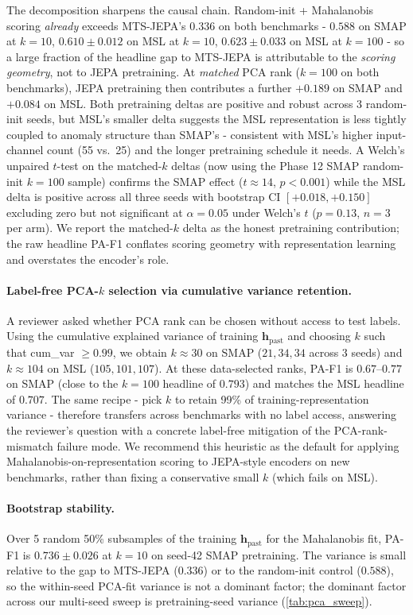 \documentclass{article}
\newcommand{\h}{\mathbf{h}}
\begin{document}
The decomposition sharpens the causal chain. Random-init + Mahalanobis scoring \emph{already} exceeds MTS-JEPA's $0.336$ on both benchmarks - $0.588$ on SMAP at $k=10$, $0.610 \pm 0.012$ on MSL at $k=10$, $0.623 \pm 0.033$ on MSL at $k=100$ - so a large fraction of the headline gap to MTS-JEPA is attributable to the \emph{scoring geometry}, not to JEPA pretraining. At \emph{matched} PCA rank ($k=100$ on both benchmarks), JEPA pretraining then contributes a further $+0.189$ on SMAP and $+0.084$ on MSL. Both pretraining deltas are positive and robust across 3 random-init seeds, but MSL's smaller delta suggests the MSL representation is less tightly coupled to anomaly structure than SMAP's - consistent with MSL's higher input-channel count (55 vs.\ 25) and the longer pretraining schedule it needs. A Welch's unpaired $t$-test on the matched-$k$ deltas (now using the Phase 12 SMAP random-init $k{=}100$ sample) confirms the SMAP effect ($t \approx 14$, $p < 0.001$) while the MSL delta is positive across all three seeds with bootstrap CI $[+0.018, +0.150]$ excluding zero but not significant at $\alpha = 0.05$ under Welch's $t$ ($p = 0.13$, $n = 3$ per arm). We report the matched-$k$ delta as the honest pretraining contribution; the raw headline PA-F1 conflates scoring geometry with representation learning and overstates the encoder's role.

\paragraph{Label-free PCA-$k$ selection via cumulative variance retention.} A reviewer asked whether PCA rank can be chosen without access to test labels. Using the cumulative explained variance of training $\h_\text{past}$ and choosing $k$ such that cum\_var $\geq 0.99$, we obtain $k \approx 30$ on SMAP ($21, 34, 34$ across 3 seeds) and $k \approx 104$ on MSL ($105, 101, 107$). At these data-selected ranks, PA-F1 is $0.67$--$0.77$ on SMAP (close to the $k=100$ headline of $0.793$) and matches the MSL headline of $0.707$. The same recipe - pick $k$ to retain 99\% of training-representation variance - therefore transfers across benchmarks with no label access, answering the reviewer's question with a concrete label-free mitigation of the PCA-rank-mismatch failure mode. We recommend this heuristic as the default for applying Mahalanobis-on-representation scoring to JEPA-style encoders on new benchmarks, rather than fixing a conservative small $k$ (which fails on MSL).

\paragraph{Bootstrap stability.} Over 5 random 50\% subsamples of the training $\h_\text{past}$ for the Mahalanobis fit, PA-F1 is $0.736 \pm 0.026$ at $k=10$ on seed-42 SMAP pretraining. The variance is small relative to the gap to MTS-JEPA ($0.336$) or to the random-init control ($0.588$), so the within-seed PCA-fit variance is not a dominant factor; the dominant factor across our multi-seed sweep is pretraining-seed variance (\cref{tab:pca_sweep}).
\end{document}
